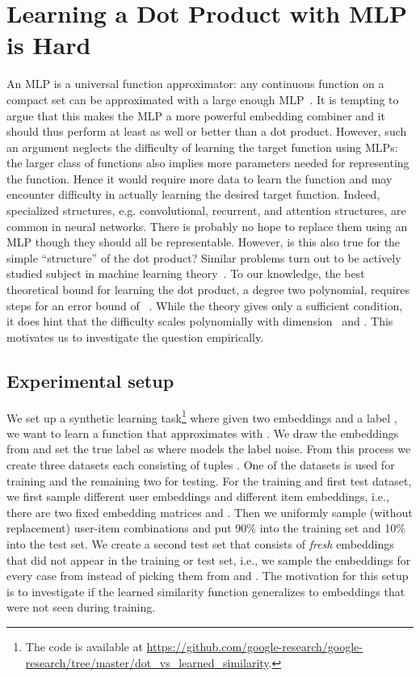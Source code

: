 \documentclass{article}
\begin{document}
\section{Learning a Dot Product with MLP is Hard}

An MLP is a universal function approximator: any continuous function on a compact set can be approximated with a large enough MLP~\cite{cybenko1989approximation,hornik1989multilayer,barron1993universal}.
It is tempting to argue that this makes the MLP a more powerful embedding combiner and it should thus perform at least as well or better than a dot product.
However, such an argument neglects the difficulty of learning the target function using MLPs: the larger class of functions also implies more parameters needed for representing the function.
Hence it would require more data to learn the function and may encounter difficulty in actually learning the desired target function.
Indeed, specialized structures, e.g. convolutional, recurrent, and attention structures, are common in neural networks.
There is probably no hope to replace them using an MLP though they should all be representable.
However, is this also true for the simple ``structure'' of the dot product?
Similar problems turn out to be actively studied subject in machine learning theory~\cite{andoni2014learning,li:nips17,du19c,allen-zhu19}.
To our knowledge, the best theoretical bound for learning the dot product, a degree two polynomial, requires  steps for an error bound of ~\cite{andoni2014learning}.
While the theory gives only a sufficient condition, it does hint that the difficulty scales polynomially with dimension~ and . This motivates us to investigate the question empirically.


\subsection{Experimental setup}
\label{sec:learning_dot}

We set up a synthetic learning task\footnote{The code is available at \url{https://github.com/google-research/google-research/tree/master/dot_vs_learned_similarity}.} where given two embeddings  and a label , we want to learn a function   that approximates  with .
We draw the embeddings  from  and set the true label as  where  models the label noise.
From this process we create three datasets each consisting of tuples .
One of the datasets is used for training and the remaining two for testing.
For the training and first test dataset, we first sample  different user embeddings and  different item embeddings, i.e., there are two fixed embedding matrices  and .
Then we uniformly sample (without replacement)  user-item combinations and put 90\% into the training set and 10\% into the test set.
We create a second test set that consists of \emph{fresh} embeddings that did not appear in the training or test set, i.e., we sample the embeddings for every case from  instead of picking them from  and .
The motivation for this setup is to investigate if the learned similarity function generalizes to embeddings that were not seen during training.
\end{document}
